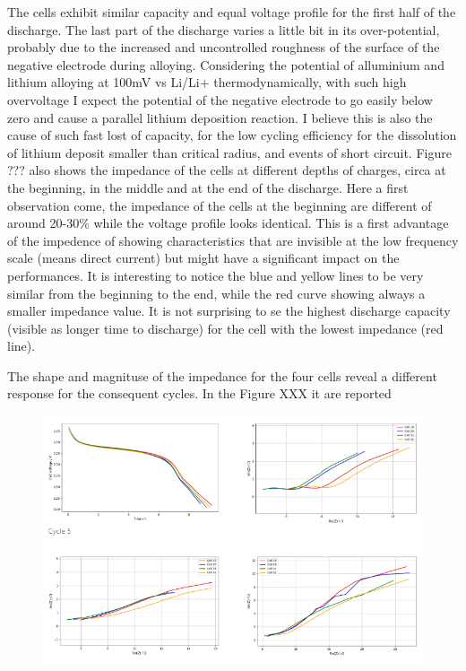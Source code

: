 The cells exhibit similar capacity and equal voltage profile for the first half of the discharge. The last part of the discharge varies a little bit in its over-potential, probably due to the increased and uncontrolled roughness of the surface of the negative electrode during alloying. Considering the potential of alluminium and lithium alloying at 100mV vs Li/Li+ thermodynamically, with such high overvoltage I expect the potential of the negative electrode to go easily below zero and cause a parallel lithium deposition reaction. I believe this is also the cause of such fast lost of capacity, for the low cycling efficiency for the dissolution of lithium deposit smaller than critical radius, and events of short circuit. Figure ???  also shows the impedance of the cells at different depths of charges, circa at the beginning, in the middle and at the end of the discharge. Here a first observation come, the impedance of the cells at the beginning are different of around 20-30\% while the voltage profile looks identical. This is a first advantage of the impedence of showing characteristics that are invisible at the low frequency scale (means direct current) but might have a significant impact on the performances. It is interesting to notice the blue and yellow lines to be very similar from the beginning to the end, while the red curve showing always a smaller impedance value. It is not surprising to se the highest discharge capacity (visible as longer time to discharge) for the cell with the lowest impedance (red line).

The shape and magnituse of the impedance for the four cells reveal a different response for the consequent cycles. In the Figure XXX it are reported

\begin{figure}
    \centering
    \includegraphics[width=\linewidth]{figures/application4/image5.PNG}
\end{figure}

